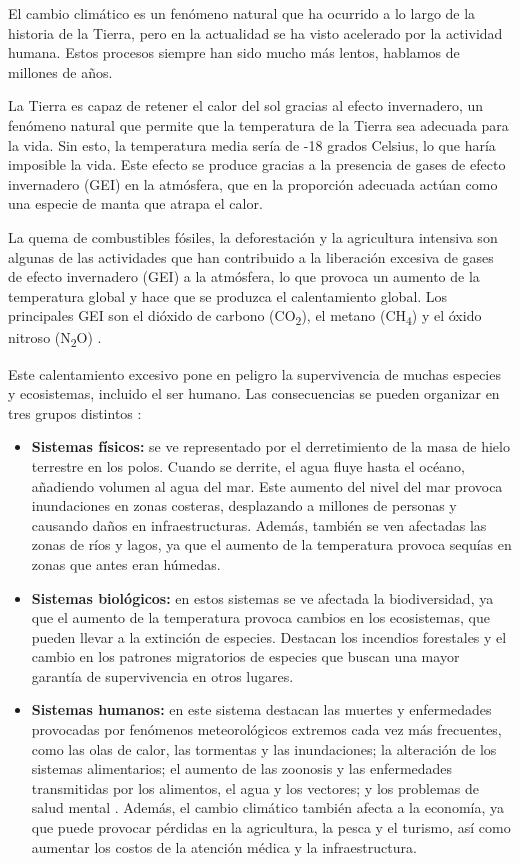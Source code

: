 \documentclass[12pt,a4paper]{report}
\begin{document}
El cambio climático es un fenómeno natural que ha ocurrido a lo largo de la
historia de la Tierra, pero en la actualidad se ha visto acelerado por la
actividad humana. Estos procesos siempre han sido mucho más lentos, hablamos de
millones de años.

La Tierra es capaz de retener el calor del sol gracias al efecto invernadero,
un fenómeno natural que permite que la temperatura de la Tierra sea adecuada
para la vida. Sin esto, la temperatura media sería de -18 grados Celsius, lo
que haría imposible la vida. Este efecto se produce gracias a la presencia de
gases de efecto invernadero (GEI) en la atmósfera, que en la proporción
adecuada actúan como una especie de manta que atrapa el calor.

La quema de combustibles fósiles, la deforestación y la agricultura intensiva
son algunas de las actividades que han contribuido a la liberación excesiva de
gases de efecto invernadero (GEI) a la atmósfera, lo que provoca un aumento de
la temperatura global y hace que se produzca el calentamiento global. Los
principales GEI son el dióxido de carbono (CO\textsubscript{2}), el metano
(CH\textsubscript{4}) y el óxido nitroso (N\textsubscript{2}O) \cite{ref1}.

Este calentamiento excesivo pone en peligro la supervivencia de muchas especies
y ecosistemas, incluido el ser humano. Las consecuencias se pueden organizar en
tres grupos distintos \cite{ref2}: 

\begin{itemize}
  \item \textbf{Sistemas físicos:} se ve representado por el derretimiento de la masa de hielo terrestre en los polos. Cuando se derrite, el agua fluye hasta el océano, añadiendo volumen al agua del mar. Este
        aumento del nivel del mar provoca inundaciones en zonas costeras, desplazando a millones de personas y causando daños en infraestructuras. Además, también se ven afectadas las zonas de ríos y lagos, ya que
        el aumento de la temperatura provoca sequías en zonas que antes eran húmedas.

  \item \textbf{Sistemas biológicos:} en estos sistemas se ve afectada la biodiversidad, ya que el aumento de la temperatura provoca cambios en los ecosistemas, que pueden llevar a la extinción de especies.
        Destacan los incendios forestales y el cambio en los patrones migratorios de especies que buscan una mayor garantía de supervivencia en otros lugares.

  \item \textbf{Sistemas humanos:} en este sistema destacan las muertes y enfermedades provocadas por fenómenos meteorológicos extremos cada vez más frecuentes, como las olas de calor, las tormentas y las
        inundaciones; la alteración de los sistemas alimentarios; el aumento de las zoonosis y las enfermedades transmitidas por los alimentos, el agua y los vectores; y los problemas de salud mental \cite{ref3}. Además, el cambio climático también afecta a la economía, ya que puede provocar pérdidas en la agricultura, la pesca y el turismo, así como aumentar los costos de la atención médica y la infraestructura.
\end{itemize}
\end{document}
